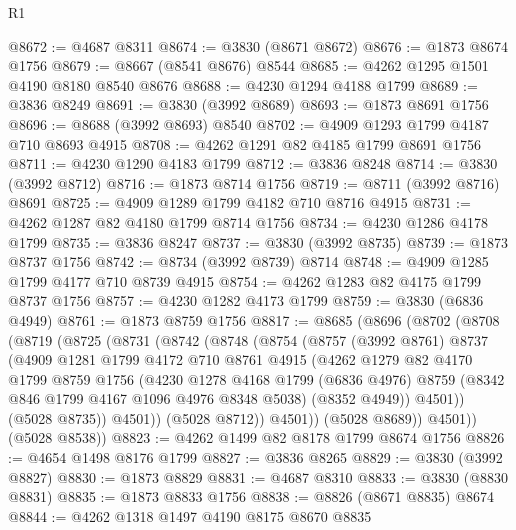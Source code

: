 \begin{lexlean}{R1}
\begin{coremodule}
@8672 := @4687 @8311
@8674 := @3830 (@8671 @8672)
@8676 := @1873 @8674 @1756
@8679 := @8667 (@8541 @8676) @8544
@8685 := @4262 @1295 @1501 @4190 @8180 @8540 @8676
@8688 := @4230 @1294 @4188 @1799
@8689 := @3836 @8249
@8691 := @3830 (@3992 @8689)
@8693 := @1873 @8691 @1756
@8696 := @8688 (@3992 @8693) @8540
@8702 := @4909 @1293 @1799 @4187 @710 @8693 @4915
@8708 := @4262 @1291 @82 @4185 @1799 @8691 @1756
@8711 := @4230 @1290 @4183 @1799
@8712 := @3836 @8248
@8714 := @3830 (@3992 @8712)
@8716 := @1873 @8714 @1756
@8719 := @8711 (@3992 @8716) @8691
@8725 := @4909 @1289 @1799 @4182 @710 @8716 @4915
@8731 := @4262 @1287 @82 @4180 @1799 @8714 @1756
@8734 := @4230 @1286 @4178 @1799
@8735 := @3836 @8247
@8737 := @3830 (@3992 @8735)
@8739 := @1873 @8737 @1756
@8742 := @8734 (@3992 @8739) @8714
@8748 := @4909 @1285 @1799 @4177 @710 @8739 @4915
@8754 := @4262 @1283 @82 @4175 @1799 @8737 @1756
@8757 := @4230 @1282 @4173 @1799
@8759 := @3830 (@6836 @4949)
@8761 := @1873 @8759 @1756
@8817 := @8685
    (@8696
      (@8702
        (@8708
          (@8719
            (@8725
              (@8731
                (@8742
                  (@8748
                    (@8754
                      (@8757
                        (@3992 @8761)
                        @8737
                        (@4909
                          @1281
                          @1799
                          @4172
                          @710
                          @8761
                          @4915
                          (@4262
                            @1279
                            @82
                            @4170
                            @1799
                            @8759
                            @1756
                            (@4230
                              @1278
                              @4168
                              @1799
                              (@6836 @4976)
                              @8759
                              (@8342 @846 @1799 @4167 @1096 @4976 @8348 @5038)
                              (@8352 @4949))
                            @4501))
                        (@5028 @8735))
                      @4501))
                  (@5028 @8712))
                @4501))
            (@5028 @8689))
          @4501))
      (@5028 @8538))
@8823 := @4262 @1499 @82 @8178 @1799 @8674 @1756
@8826 := @4654 @1498 @8176 @1799
@8827 := @3836 @8265
@8829 := @3830 (@3992 @8827)
@8830 := @1873 @8829
@8831 := @4687 @8310
@8833 := @3830 (@8830 @8831)
@8835 := @1873 @8833 @1756
@8838 := @8826 (@8671 @8835) @8674
@8844 := @4262 @1318 @1497 @4190 @8175 @8670 @8835

\end{coremodule}
\end{lexlean}
